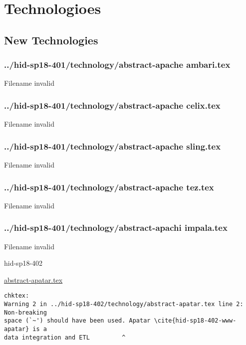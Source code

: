 \part{Technologioes}
\chapter{New Technologies}
\section{../hid-sp18-401/technology/abstract-apache ambari.tex}
Filename invalid
\section{../hid-sp18-401/technology/abstract-apache celix.tex}
Filename invalid
\section{../hid-sp18-401/technology/abstract-apache sling.tex}
Filename invalid
\section{../hid-sp18-401/technology/abstract-apache tez.tex}
Filename invalid
\section{../hid-sp18-401/technology/abstract-apachi impala.tex}
Filename invalid


\begin{IU}

hid-sp18-402

\href{https://github.com/cloudmesh-community/hid-sp18-402/blob/master//technology/abstract-apatar.tex}{abstract-apatar.tex}

\begin{tiny}
\begin{verbatim}
chktex:
Warning 2 in ../hid-sp18-402/technology/abstract-apatar.tex line 2: Non-breaking
space (`~') should have been used. Apatar \cite{hid-sp18-402-www-apatar} is a
data integration and ETL         ^
\end{verbatim}
\end{tiny}
\end{IU}



